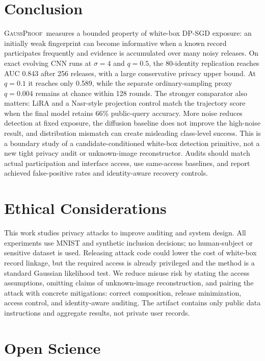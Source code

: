 \documentclass[conference]{IEEEtran}
\newcommand{\method}{\textsc{GaussProof}}
\begin{document}
\section{Conclusion}

\method~measures a bounded property of white-box DP-SGD exposure: an initially weak fingerprint can become informative when a known record participates frequently and evidence is accumulated over many noisy releases. On exact evolving CNN runs at $\sigma=4$ and $q=0.5$, the 80-identity replication reaches AUC 0.843 after 256 releases, with a large conservative privacy upper bound. At $q=0.1$ it reaches only 0.589, while the separate ordinary-sampling proxy $q=0.004$ remains at chance within 128 rounds. The stronger comparator also matters: LiRA and a Nasr-style projection control match the trajectory score when the final model retains 66\% public-query accuracy. More noise reduces detection at fixed exposure, the diffusion baseline does not improve the high-noise result, and distribution mismatch can create misleading class-level success. This is a boundary study of a candidate-conditioned white-box detection primitive, not a new tight privacy audit or unknown-image reconstructor. Audits should match actual participation and interface access, use same-access baselines, and report achieved false-positive rates and identity-aware recovery controls.

\section*{Ethical Considerations}

This work studies privacy attacks to improve auditing and system design. All experiments use MNIST and synthetic inclusion decisions; no human-subject or sensitive dataset is used. Releasing attack code could lower the cost of white-box record linkage, but the required access is already privileged and the method is a standard Gaussian likelihood test. We reduce misuse risk by stating the access assumptions, omitting claims of unknown-image reconstruction, and pairing the attack with concrete mitigations: correct composition, release minimization, access control, and identity-aware auditing. The artifact contains only public data instructions and aggregate results, not private user records.

\section*{Open Science}
\end{document}
